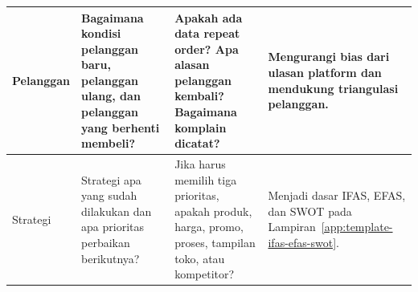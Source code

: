 \begin{table}[!htbp]
\begin{tabularx}{\textwidth}{|Z{2.2cm}|Y|Y|Y|}
        Pelanggan & Bagaimana kondisi pelanggan baru, pelanggan ulang, dan pelanggan yang berhenti membeli? & Apakah ada data repeat order? Apa alasan pelanggan kembali? Bagaimana komplain dicatat? & Mengurangi bias dari ulasan platform dan mendukung triangulasi pelanggan. \\ \hline
        Strategi & Strategi apa yang sudah dilakukan dan apa prioritas perbaikan berikutnya? & Jika harus memilih tiga prioritas, apakah produk, harga, promo, proses, tampilan toko, atau kompetitor? & Menjadi dasar IFAS, EFAS, dan SWOT pada Lampiran~\ref{app:template-ifas-efas-swot}. \\ \hline
        \bottomrule
    \end{tabularx}
\end{table}


